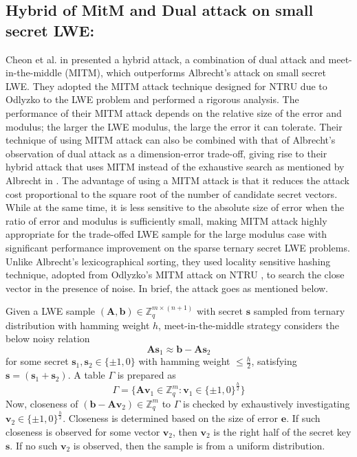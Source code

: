 \subsection{Hybrid of MitM and Dual attack on small secret LWE:}
Cheon et al. in \cite{cheon2019hybrid} presented a hybrid attack, a combination of dual attack and meet-in-the-middle (MITM), which outperforms Albrecht’s attack on small secret LWE. They adopted the MITM attack technique designed for NTRU due to Odlyzko to the LWE problem and performed a rigorous analysis. The performance of their MITM attack depends on the relative size of the error and modulus; the larger the LWE modulus, the large the error it can tolerate. Their technique of using MITM attack can also be combined with that of Albrecht’s observation of dual attack as a dimension-error trade-off, giving rise to their hybrid attack that uses MITM instead of the exhaustive search as mentioned by Albrecht in \cite{albrecht2017dual}. The advantage of using a MITM attack is that it reduces the attack cost proportional to the square root of the number of candidate secret vectors. While at the same time, it is less sensitive to the absolute size of error when the ratio of error and modulus is sufficiently small, making MITM attack highly appropriate for the trade-offed LWE sample for the large modulus case with significant performance improvement on the sparse ternary secret LWE problems.
Unlike Albrecht’s lexicographical sorting, they used locality sensitive hashing technique, adopted from Odlyzko’s MITM attack on NTRU \cite{NHowgraveGraham}, to search the close vector in the presence of noise. In brief, the attack goes as mentioned below.

Given a LWE sample $(\textbf{A},\textbf{b}) \in \mathbb{Z}_q^{m \times (n+1)}$ with secret $\textbf{s}$ sampled from ternary distribution with hamming weight $h$, meet-in-the-middle strategy considers the below noisy relation
\begin{equation}
    \label{eq:MITM_v2}
    \textbf{As}_1 \approx \textbf{b}-\textbf{As}_2
\end{equation}
for some secret $\textbf{s}_1,\textbf{s}_2 \in \{\pm1,0\}$ with hamming weight $\leq \frac{h}{2}$, satisfying $\textbf{s}=(\textbf{s}_1+\textbf{s}_2)$. A table $\Gamma$ is prepared as
\begin{equation}
    \label{eq:MITM_v1}
    \Gamma = \{ \textbf{Av}_1 \in \mathbb{Z}_q^m: \textbf{v}_1 \in \{\pm1,0\}^{\frac{h}{2}} \}
\end{equation}
Now, closeness of $(\textbf{b}-\textbf{Av}_2)\in \mathbb{Z}^m_q$ to $\Gamma$ is checked by exhaustively investigating $\textbf{v}_2 \in \{\pm1,0\}^{\frac{h}{2}}$. Closeness is determined based on the size of error $\textbf{e}$. If such closeness is observed for some vector $\textbf{v}_2$, then $\textbf{v}_2$ is the right half of the secret key $\textbf{s}$. If no such $\textbf{v}_2$ is observed, then the sample is from a uniform distribution.

